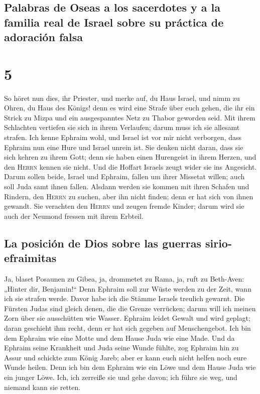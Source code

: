 \hypertarget{palabras-de-oseas-a-los-sacerdotes-y-a-la-familia-real-de-israel-sobre-su-pruxe1ctica-de-adoraciuxf3n-falsa}{%
\subsection{Palabras de Oseas a los sacerdotes y a la familia real de
Israel sobre su práctica de adoración
falsa}\label{palabras-de-oseas-a-los-sacerdotes-y-a-la-familia-real-de-israel-sobre-su-pruxe1ctica-de-adoraciuxf3n-falsa}}

\hypertarget{section-4}{%
\section{5}\label{section-4}}

 So höret nun dies, ihr Priester, und merke auf, du Haus
Israel, und nimm zu Ohren, du Haus des Königs! denn es wird eine Strafe
über euch gehen, die ihr ein Strick zu Mizpa und ein ausgespanntes Netz
zu Thabor geworden seid.  Mit ihrem Schlachten vertiefen
sie sich in ihrem Verlaufen; darum muss ich sie allesamt strafen.
 Ich kenne Ephraim wohl, und Israel ist vor mir nicht
verborgen, dass Ephraim nun eine Hure und Israel unrein ist.
 Sie denken nicht daran, dass sie sich kehren zu ihrem
Gott; denn sie haben einen Hurengeist in ihrem Herzen, und den
\textsc{Herrn} kennen sie nicht.  Und die Hoffart Israels
zeugt wider sie ins Angesicht. Darum sollen beide, Israel und Ephraim,
fallen um ihrer Missetat willen; auch soll Juda samt ihnen fallen.
 Alsdann werden sie kommen mit ihren Schafen und Rindern,
den \textsc{Herrn} zu suchen, aber ihn nicht finden; denn er hat sich
von ihnen gewandt.  Sie verachten den \textsc{Herrn} und
zeugen fremde Kinder; darum wird sie auch der Neumond fressen mit ihrem
Erbteil.

\hypertarget{la-posiciuxf3n-de-dios-sobre-las-guerras-sirio-efraimitas}{%
\subsection{La posición de Dios sobre las guerras
sirio-efraimitas}\label{la-posiciuxf3n-de-dios-sobre-las-guerras-sirio-efraimitas}}

 Ja, blaset Posaunen zu Gibea, ja, drommetet zu Rama, ja,
ruft zu Beth-Aven: „Hinter dir, Benjamin!{}``  Denn
Ephraim soll zur Wüste werden zu der Zeit, wann ich sie strafen werde.
Davor habe ich die Stämme Israels treulich gewarnt.  Die
Fürsten Judas sind gleich denen, die die Grenze verrücken; darum will
ich meinen Zorn über sie ausschütten wie Wasser.  Ephraim
leidet Gewalt und wird geplagt; daran geschieht ihm recht, denn er hat
sich gegeben auf Menschengebot.  Ich bin dem Ephraim wie
eine Motte und dem Hause Juda wie eine Made.  Und da
Ephraim seine Krankheit und Juda seine Wunde fühlte, zog Ephraim hin zu
Assur und schickte zum König Jareb; aber er kann euch nicht helfen noch
eure Wunde heilen.  Denn ich bin dem Ephraim wie ein Löwe
und dem Hause Juda wie ein junger Löwe. Ich, ich zerreiße sie und gehe
davon; ich führe sie weg, und niemand kann sie retten.


